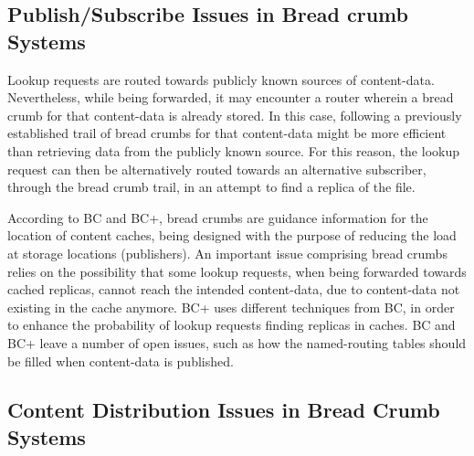 \subsection{Publish/Subscribe Issues in Bread crumb Systems}


\begin{comment}
The lookup requests are directed towards the nearest copy stored in the network, according to some metric 
at named-content tables. \eat{Lookup-requests carry content-ids composed of human readable names. Those } Content names are used
by the routers, to forward the requests according to information contained in routing-tables. As lookup-requests are forwarded, they are stored at 
the routers as a bread crumbs, which implies lookup-requests leaving a trail of bread crumbs from the subscriber up to 
the corresponding content-data storage location. Content-data is delivered in the reverse path of bread crumbs.

\end{comment}

Lookup requests are routed towards publicly known sources of  content-data. 
Nevertheless, while being forwarded, it may encounter a router wherein a bread crumb for that content-data
is already stored. In this case, following a previously established trail of bread crumbs for that content-data might be more efficient than 
retrieving data from  the publicly 
known source.  For this reason, the lookup request can then be alternatively routed towards an alternative subscriber,
through the bread crumb trail, in an attempt to find a replica of the file. 



According to BC and BC+, bread crumbs are guidance information for the location of content caches,
being designed with the purpose of reducing the load at storage locations (publishers).
An important issue comprising bread crumbs relies on the possibility that some lookup requests, 
when being forwarded towards cached replicas, cannot reach the intended content-data,
due to content-data not existing in the cache anymore. BC+ uses different techniques from BC, 
in order to enhance the probability of lookup requests finding replicas in caches. BC and BC+ leave a number of open 
issues, such as how the named-routing tables should be filled when content-data is published.





\subsection{Content Distribution Issues in Bread Crumb Systems}


